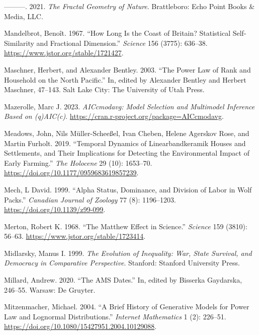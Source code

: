 \documentclass[
  12pt,
  a4paper, twoside]{book}
\newlength{\cslhangindent}
\newlength{\cslentryspacingunit} %
\newenvironment{CSLReferences}[2] %
 {%
  \setlength{\parindent}{0pt}
  \ifodd #1
  \let\oldpar\par
  \def\par{\hangindent=\cslhangindent\oldpar}
  \fi
  \setlength{\parskip}{#2\cslentryspacingunit}
 }%
 {}
\begin{document}
\begin{CSLReferences}{1}{0}
\leavevmode{}%
---------. 2021. \emph{The Fractal Geometry of Nature}. Brattleboro: Echo Point Books \& Media, LLC.

\leavevmode{}%
Mandelbrot, Benoît. 1967. {``How Long Is the Coast of Britain? Statistical Self-Similarity and Fractional Dimension.''} \emph{Science} 156 (3775): 636--38. \url{https://www.jstor.org/stable/1721427}.

\leavevmode{}%
Maschner, Herbert, and Alexander Bentley. 2003. {``The Power Law of Rank and Household on the North Pacific.''} In, edited by Alexander Bentley and Herbert Maschner, 47--143. Salt Lake City: The University of Utah Press.

\leavevmode{}%
Mazerolle, Marc J. 2023. \emph{AICcmodavg: Model Selection and Multimodel Inference Based on (q)AIC(c)}. \url{https://cran.r-project.org/package=AICcmodavg}.

\leavevmode{}%
Meadows, John, Nils Müller-Scheeßel, Ivan Cheben, Helene Agerskov Rose, and Martin Furholt. 2019. {``Temporal Dynamics of Linearbandkeramik Houses and Settlements, and Their Implications for Detecting the Environmental Impact of Early Farming.''} \emph{The Holocene} 29 (10): 1653--70. \url{https://doi.org/10.1177/0959683619857239}.

\leavevmode{}%
Mech, L David. 1999. {``Alpha Status, Dominance, and Division of Labor in Wolf Packs.''} \emph{Canadian Journal of Zoology} 77 (8): 1196--1203. \url{https://doi.org/10.1139/z99-099}.

\leavevmode{}%
Merton, Robert K. 1968. {``The Matthew Effect in Science.''} \emph{Science} 159 (3810): 56--63. \url{https://www.jstor.org/stable/1723414}.

\leavevmode{}%
Midlarsky, Manus I. 1999. \emph{The Evolution of Inequality: War, State Survival, and Democracy in Comparative Perspective}. Stanford: Stanford University Press.

\leavevmode{}%
Millard, Andrew. 2020. {``The AMS Dates.''} In, edited by Bisserka Gaydarska, 246--55. Warsaw: De Gruyter.

\leavevmode{}%
Mitzenmacher, Michael. 2004. {``A Brief History of Generative Models for Power Law and Lognormal Distributions.''} \emph{Internet Mathematics} 1 (2): 226--51. \url{https://doi.org/10.1080/15427951.2004.10129088}.


\end{CSLReferences}
\end{document}
